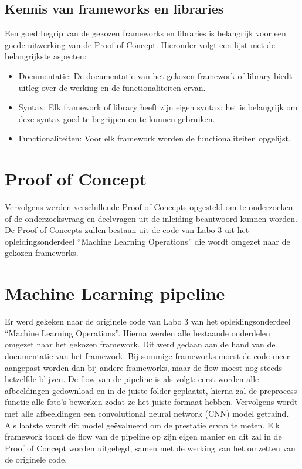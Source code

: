 \subsection{Kennis van frameworks en libraries}
Een goed begrip van de gekozen frameworks en libraries is belangrijk voor een goede uitwerking van de Proof of Concept. Hieronder volgt een lijst met de belangrijkste aspecten:
\begin{itemize}
  \item Documentatie: De documentatie van het gekozen framework of library biedt uitleg over de werking en de functionaliteiten ervan.
  \item Syntax: Elk framework of library heeft zijn eigen syntax; het is belangrijk om deze syntax goed te begrijpen en te kunnen gebruiken.
  \item Functionaliteiten: Voor elk framework worden de functionaliteiten opgelijst.
\end{itemize}
\section{Proof of Concept}
Vervolgens werden verschillende Proof of Concepts opgesteld om te onderzoeken of de onderzoeksvraag en deelvragen uit de inleiding beantwoord kunnen worden. De Proof of Concepts zullen bestaan uit de code van Labo 3 uit het opleidingsonderdeel ``Machine Learning Operations'' die wordt omgezet naar de gekozen frameworks.
\section{Machine Learning pipeline}
Er werd gekeken naar de originele code van Labo 3 van het opleidingsonderdeel ``Machine Learning Operations''. Hierna werden alle bestaande onderdelen omgezet naar het gekozen framework. Dit werd gedaan aan de hand van de documentatie van het framework. Bij sommige frameworks moest de code meer aangepast worden dan bij andere frameworks, maar de flow moest nog steeds hetzelfde blijven.
De flow van de pipeline is als volgt: eerst worden alle afbeeldingen gedownload en in de juiste folder geplaatst, hierna zal de preprocess functie alle foto's bewerken zodat ze het juiste formaat hebben. Vervolgens wordt met alle afbeeldingen een convolutional neural network (CNN) model getraind. Als laatste wordt dit model geëvalueerd om de prestatie ervan te meten.
Elk framework toont de flow van de pipeline op zijn eigen manier en dit zal in de Proof of Concept worden uitgelegd, samen met de werking van het omzetten van de originele code.

